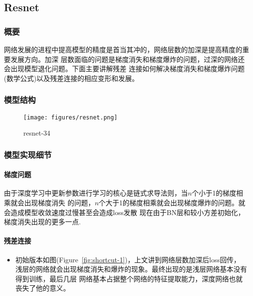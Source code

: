 \documentclass{article}
\begin{document}
\begin{CJK}{UTF8}{gbsn}
\subsection{Resnet}
\subsubsection{概要}
网络发展的进程中提高模型的精度是首当其冲的，网络层数的加深是提高精度的重要发展方向。加深
层数面临的问题是梯度消失和梯度爆炸的问题，过深的网络还会出现模型退化问题。下面主要讲解残差
连接如何解决梯度消失和梯度爆炸问题(数学公式)以及残差连接的相应变形和发展。


\subsubsection{模型结构}
\begin{figure}[!h]
    \centering
    \texttt{[image: figures/resnet.png]}
    \caption{resnet-34}
    \label{fig:resnet}
\end{figure}


\subsubsection{模型实现细节}
\paragraph{梯度问题}
由于深度学习中更新参数进行学习的核心是链式求导法则，当$n$个小于1的梯度相乘就会出现梯度消失
的问题，$n$个大于1的梯度相乘就会出现梯度爆炸的问题。就会造成模型收敛速度过慢甚至会造成loss发散
现在由于BN层和较小方差初始化，梯度消失出现的更多一点.


\paragraph{残差连接}
\begin{itemize}
    \item 初始版本如图(Figure~\ref{fig:shortcut-1})，上文讲到网络层数加深后loss回传，
    浅层的网络就会出现梯度消失和爆炸的现象。最终出现的是浅层网络基本没有得到训练，最后几层
    网络基本占据整个网络的特征提取能力，深度网络也就丧失了他的意义。


\end{itemize}
\end{CJK}
\end{document}

